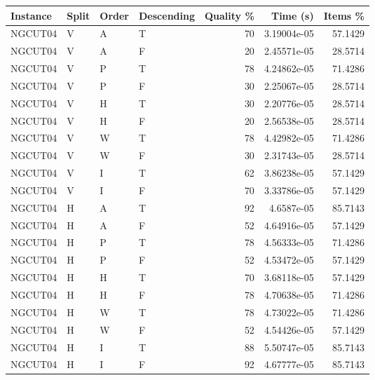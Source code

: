 \begin{tabular}{llllrrr}
    \hline
    Instance & Split & Order & Descending & Quality \% & Time (s)    & Items \% \\
    \hline
    NGCUT04  & V     & A     & T          & 70         & 3.19004e-05 & 57.1429  \\
    NGCUT04  & V     & A     & F          & 20         & 2.45571e-05 & 28.5714  \\
    NGCUT04  & V     & P     & T          & 78         & 4.24862e-05 & 71.4286  \\
    NGCUT04  & V     & P     & F          & 30         & 2.25067e-05 & 28.5714  \\
    NGCUT04  & V     & H     & T          & 30         & 2.20776e-05 & 28.5714  \\
    NGCUT04  & V     & H     & F          & 20         & 2.56538e-05 & 28.5714  \\
    NGCUT04  & V     & W     & T          & 78         & 4.42982e-05 & 71.4286  \\
    NGCUT04  & V     & W     & F          & 30         & 2.31743e-05 & 28.5714  \\
    NGCUT04  & V     & I     & T          & 62         & 3.86238e-05 & 57.1429  \\
    NGCUT04  & V     & I     & F          & 70         & 3.33786e-05 & 57.1429  \\
    NGCUT04  & H     & A     & T          & 92         & 4.6587e-05  & 85.7143  \\
    NGCUT04  & H     & A     & F          & 52         & 4.64916e-05 & 57.1429  \\
    NGCUT04  & H     & P     & T          & 78         & 4.56333e-05 & 71.4286  \\
    NGCUT04  & H     & P     & F          & 52         & 4.53472e-05 & 57.1429  \\
    NGCUT04  & H     & H     & T          & 70         & 3.68118e-05 & 57.1429  \\
    NGCUT04  & H     & H     & F          & 78         & 4.70638e-05 & 71.4286  \\
    NGCUT04  & H     & W     & T          & 78         & 4.73022e-05 & 71.4286  \\
    NGCUT04  & H     & W     & F          & 52         & 4.54426e-05 & 57.1429  \\
    NGCUT04  & H     & I     & T          & 88         & 5.50747e-05 & 85.7143  \\
    NGCUT04  & H     & I     & F          & 92         & 4.67777e-05 & 85.7143  \\

\end{tabular}
